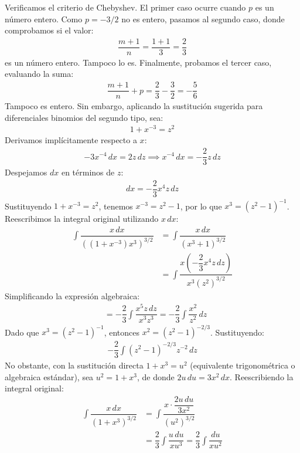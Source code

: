 Verificamos el criterio de Chebyshev. El primer caso ocurre cuando $p$ es un número entero. Como $p = -3/2$ no es entero, pasamos al segundo caso, donde comprobamos si el valor:
\begin{align*}
\dfrac{m + 1}{n} = \dfrac{1 + 1}{3} = \dfrac{2}{3}
\end{align*}
es un número entero. Tampoco lo es. Finalmente, probamos el tercer caso, evaluando la suma:
\begin{align*}
\dfrac{m + 1}{n} + p = \dfrac{2}{3} - \dfrac{3}{2} = -\dfrac{5}{6}
\end{align*}
Tampoco es entero. Sin embargo, aplicando la sustitución sugerida para diferenciales binomios del segundo tipo, sea:
\begin{align*}
1 + x^{-3} = z^2
\end{align*}
Derivamos implícitamente respecto a $x$:
\begin{align*}
-3x^{-4} \, dx = 2z \, dz \implies x^{-4} \, dx = -\dfrac{2}{3}z \, dz
\end{align*}
Despejamos $dx$ en términos de $z$:
\begin{align*}
dx = -\dfrac{2}{3} x^4 z \, dz
\end{align*}
Sustituyendo $1 + x^{-3} = z^2$, tenemos $x^{-3} = z^2 - 1$, por lo que $x^3 = (z^2 - 1)^{-1}$. Reescribimos la integral original utilizando $x \, dx$:
\begin{align*}
\int \dfrac{x \, dx}{((1 + x^{-3})x^3)^{3/2}} &= \int \dfrac{x \, dx}{(x^3 + 1)^{3/2}} \\
&= \int \dfrac{x \left(-\dfrac{2}{3} x^4 z \, dz\right)}{x^3 (z^2)^{3/2}}
\end{align*}
Simplificando la expresión algebraica:
\begin{align*}
&= -\dfrac{2}{3} \int \dfrac{x^5 z \, dz}{x^3 z^3} = -\dfrac{2}{3} \int \dfrac{x^2}{z^2} \, dz
\end{align*}
Dado que $x^3 = (z^2 - 1)^{-1}$, entonces $x^2 = (z^2 - 1)^{-2/3}$. Sustituyendo:
\begin{align*}
-\dfrac{2}{3} \int (z^2 - 1)^{-2/3} z^{-2} \, dz
\end{align*}
No obstante, con la sustitución directa $1 + x^3 = u^2$ (equivalente trigonométrica o algebraica estándar), sea $u^2 = 1 + x^3$, de donde $2u \, du = 3x^2 \, dx$. 
Reescribiendo la integral original:
\begin{align*}
\int \dfrac{x \, dx}{(1 + x^3)^{3/2}} &= \int \dfrac{x \cdot \dfrac{2u \, du}{3x^2}}{(u^2)^{3/2}} \\
&= \dfrac{2}{3} \int \dfrac{u \, du}{x u^3} = \dfrac{2}{3} \int \dfrac{du}{x u^2}
\end{align*}
